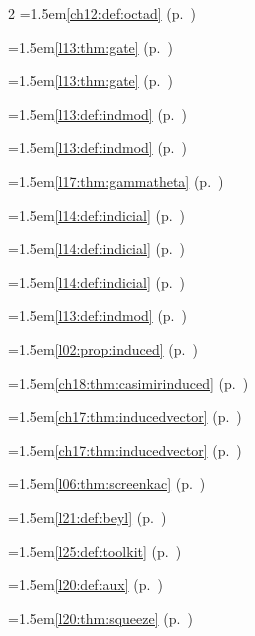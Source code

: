 \begin{multicols}{2}
\hangindent=1.5em\quad \ref{ch12:def:octad} (p.~\pageref{ch12:def:octad})\par
\hangindent=1.5em\quad \ref{l13:thm:gate} (p.~\pageref{l13:thm:gate})\par
\hangindent=1.5em\quad \ref{l13:thm:gate} (p.~\pageref{l13:thm:gate})\par
\hangindent=1.5em\quad \ref{l13:def:indmod} (p.~\pageref{l13:def:indmod})\par
\hangindent=1.5em\quad \ref{l13:def:indmod} (p.~\pageref{l13:def:indmod})\par
\hangindent=1.5em\quad \ref{l17:thm:gammatheta} (p.~\pageref{l17:thm:gammatheta})\par
\hangindent=1.5em\quad \ref{l14:def:indicial} (p.~\pageref{l14:def:indicial})\par
\hangindent=1.5em\quad \ref{l14:def:indicial} (p.~\pageref{l14:def:indicial})\par
\hangindent=1.5em\quad \ref{l14:def:indicial} (p.~\pageref{l14:def:indicial})\par
\hangindent=1.5em\quad \ref{l13:def:indmod} (p.~\pageref{l13:def:indmod})\par
\hangindent=1.5em\quad \ref{l02:prop:induced} (p.~\pageref{l02:prop:induced})\par
\hangindent=1.5em\quad \ref{ch18:thm:casimirinduced} (p.~\pageref{ch18:thm:casimirinduced})\par
\hangindent=1.5em\quad \ref{ch17:thm:inducedvector} (p.~\pageref{ch17:thm:inducedvector})\par
\hangindent=1.5em\quad \ref{ch17:thm:inducedvector} (p.~\pageref{ch17:thm:inducedvector})\par
\hangindent=1.5em\quad \ref{l06:thm:screenkac} (p.~\pageref{l06:thm:screenkac})\par
\hangindent=1.5em\quad \ref{l21:def:beyl} (p.~\pageref{l21:def:beyl})\par
\hangindent=1.5em\quad \ref{l25:def:toolkit} (p.~\pageref{l25:def:toolkit})\par
\hangindent=1.5em\quad \ref{l20:def:aux} (p.~\pageref{l20:def:aux})\par
\hangindent=1.5em\quad \ref{l20:thm:squeeze} (p.~\pageref{l20:thm:squeeze})\par

\end{multicols}

